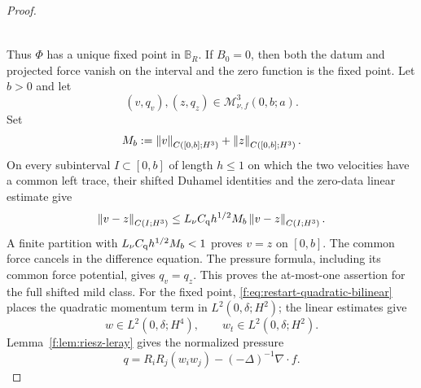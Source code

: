 \begin{proof}
\begin{samepage}
\begin{align*}
\end{align*}
\end{samepage}
Thus \(\Phi\) has a unique fixed point in \(\mathbb B_R\).  If \(B_0=0\),
then both the datum and projected force vanish on the interval and the zero
function is the fixed point.  Let \(b>0\) and let
\[
 (v,q_v),(z,q_z)\in\mathscr M_{\nu,f}^3(0,b;a).
\]
Set
\[
 M_b:=\left\lVert v\right\rVert_{C([0,b];H^3)}+\left\lVert z\right\rVert_{C([0,b];H^3)}.
\]
On every subinterval \(I\subset[0,b]\) of length \(h\le1\) on which the two
velocities have a common left trace, their shifted Duhamel identities and the
zero-data linear estimate give
\[
 \left\lVert v-z\right\rVert_{C(I;H^3)}
 \le L_\nu C_{\rm q}h^{1/2}M_b
 \left\lVert v-z\right\rVert_{C(I;H^3)}.
\]
A finite partition with
\(L_\nu C_{\rm q}h^{1/2}M_b<1\) proves \(v=z\) on \([0,b]\).
The common force cancels in the difference equation.  The pressure formula,
including its common force potential, gives \(q_v=q_z\).  This proves the at-most-one
assertion for the full shifted mild class.  For the fixed point,
\eqref{f:eq:restart-quadratic-bilinear} places the quadratic momentum term in
\(L^2(0,\delta;H^2)\); the linear estimates give
\[
 w\in L^2(0,\delta;H^4),
 \qquad
 w_t\in L^2(0,\delta;H^2).
\]
Lemma~\ref{f:lem:riesz-leray} gives the normalized pressure
\[
 q=R_iR_j(w_iw_j)-(-\Delta)^{-1}\nabla\cdot f.
\]


\end{proof}
